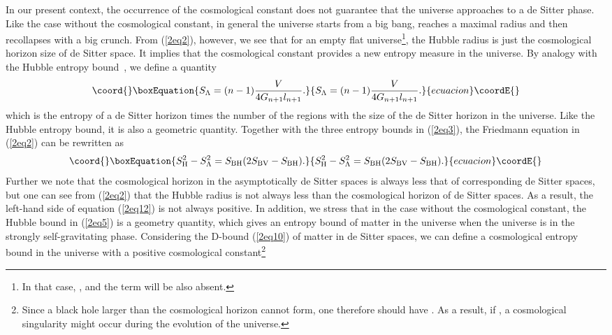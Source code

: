 \documentclass[a4paper,12pt]{article}
\begin{document}
In our present context, the occurrence of the cosmological
constant does not guarantee that the universe approaches to a de
Sitter phase. Like the case without the cosmological constant,
 in general the universe starts from a big bang, reaches a
maximal radius and then recollapses with a big crunch. From
(\ref{2eq2}), however, we see that for an empty flat
universe\footnote{In that case, \coordHE{}, and the term \coordHE{} will be
also absent.}, the Hubble radius is just the cosmological horizon size
\coordHE{} of de Sitter space. It implies that the cosmological constant
provides a new entropy measure in the universe. By analogy with the
Hubble entropy bound~\cite{FS,Hubb,Verl}, we define a quantity 
\begin{equation}\coord{}\boxEquation{
\label{2eq11} S_{\rm \Lambda} =(n-1)\frac{V}{4G_{n+1}l_{n+1}}.
}{
S_{\rm \Lambda} =(n-1)\frac{V}{4G_{n+1}l_{n+1}}.
}{ecuacion}\coordE{}\end{equation}
which  is the entropy of a de Sitter horizon times the number of the regions 
with the size of the de Sitter horizon  in
the universe. Like the Hubble entropy bound, it is also a geometric 
quantity.  Together with the  three entropy
bounds in (\ref{2eq3}),  the Friedmann equation in
(\ref{2eq2}) can be rewritten as
\begin{equation}\coord{}\boxEquation{
\label{2eq12}
  S_{\rm H}^2-S_{\rm \Lambda}^2=S_{\rm BH}(2S_{\rm BV}-S_{\rm
  BH}).
}{
S_{\rm H}^2-S_{\rm \Lambda}^2=S_{\rm BH}(2S_{\rm BV}-S_{\rm
  BH}).
}{ecuacion}\coordE{}\end{equation}
Further we note that the cosmological horizon in the
asymptotically de Sitter spaces is always less that of corresponding de
Sitter spaces, but one can see from (\ref{2eq2}) that the Hubble radius \coordHE{} 
is not always less than the cosmological horizon \coordHE{} of de Sitter spaces. 
As a result, the left-hand side of equation (\ref{2eq12}) is not always
positive. In addition, we stress that in the case without the
cosmological constant, the Hubble bound in (\ref{2eq5}) is a
geometry quantity, which gives an entropy bound of matter in the
universe when the universe is in the strongly self-gravitating
phase. Considering the D-bound (\ref{2eq10}) of matter in de
Sitter spaces, we can define a cosmological entropy
bound in the universe with a positive cosmological
constant\footnote{Since a black hole larger than the cosmological
horizon cannot form, one therefore should have \coordHE{}. As a result, if \coordHE{}, a
cosmological singularity might occur during the evolution of the
universe.}
\end{document}
